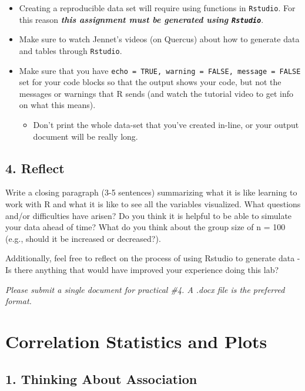 \documentclass[
]{book}
\providecommand{\tightlist}{%
  \setlength{\itemsep}{0pt}\setlength{\parskip}{0pt}}
\begin{document}
\begin{itemize}
\item
  Creating a reproducible data set will require using functions in \texttt{Rstudio}. For this reason \textbf{\emph{this assignment must be generated using \texttt{Rstudio}}}.
\item
  Make sure to watch Jennet's videos (on Quercus) about how to generate data and tables through \texttt{Rstudio}.
\item
  Make sure that you have \texttt{echo\ =\ TRUE,\ warning\ =\ FALSE,\ message\ =\ FALSE} set for your code blocks so that the output shows your code, but not the messages or warnings that R sends (and watch the tutorial video to get info on what this means).

  \begin{itemize}
  \tightlist
  \item
    Don't print the whole data-set that you've created in-line, or your output document will be really long.
  \end{itemize}
\end{itemize}

\section*{4. Reflect}\label{reflect-2}

Write a closing paragraph (3-5 sentences) summarizing what it is like learning to work with R and what it is like to see all the variables visualized. What questions and/or difficulties have arisen? Do you think it is helpful to be able to simulate your data ahead of time? What do you think about the group size of n = 100 (e.g., should it be increased or decreased?).

Additionally, feel free to reflect on the process of using Rstudio to generate data - Is there anything that would have improved your experience doing this lab?

\emph{Please submit a single document for practical \#4. A .docx file is the preferred format.}

\chapter{Correlation Statistics and Plots}\label{correlation-statistics-and-plots}

\section*{1. Thinking About Association}\label{thinking-about-association}
\end{document}
